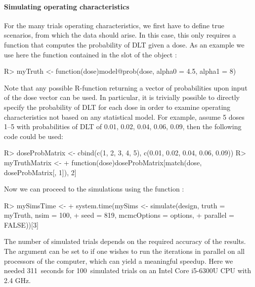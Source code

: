 \documentclass[article]{jss}\usepackage[]{graphicx}\usepackage[]{color}
\begin{document}
\paragraph{Simulating operating characteristics} For the many trials operating characteristics, we first have to define true scenarios, from which the data should arise. In this case, this only requires a function that computes the probability of DLT given a dose. As an example we use here the function contained in the slot  of the object :
\begin{Schunk}
\begin{Sinput}
R> myTruth <- function(dose){model@prob(dose, alpha0 = 4.5, alpha1 = 8)}
\end{Sinput}
\end{Schunk}
Note that any possible R-function returning a vector of probabilities upon input of the dose vector can be used. In particular, it is trivially possible to directly specify the probability of DLT for each dose in order to examine operating characteristics not based on any statistical model. For example, assume 5 doses 1--5 with probabilities of DLT of 0.01, 0.02, 0.04, 0.06, 0.09, then the following code could be used:
\begin{Schunk}
\begin{Sinput}
R> doseProbMatrix <- cbind(c(1, 2, 3, 4, 5), c(0.01, 0.02, 0.04, 0.06, 0.09))
R> myTruthMatrix <- 
+    function(dose){doseProbMatrix[match(dose, doseProbMatrix[, 1]), 2]}
\end{Sinput}
\end{Schunk}
Now we can proceed to the simulations using the function :
\begin{Schunk}
\begin{Sinput}
R> mySimsTime <- 
+    system.time(mySims <- simulate(design, truth = myTruth, nsim = 100, 
+                                   seed = 819, mcmcOptions = options, 
+                                   parallel = FALSE))[3]
\end{Sinput}
\end{Schunk}
The number of simulated trials depends on the required accuracy of the results. The argument  can be set to  if one wishes to run the iterations in parallel on all processors of the computer, which can yield a meaningful speedup. Here we 
needed 311~seconds for 100~simulated trials
on an Intel Core i5-6300U CPU with 2.4 GHz.
\end{document}

